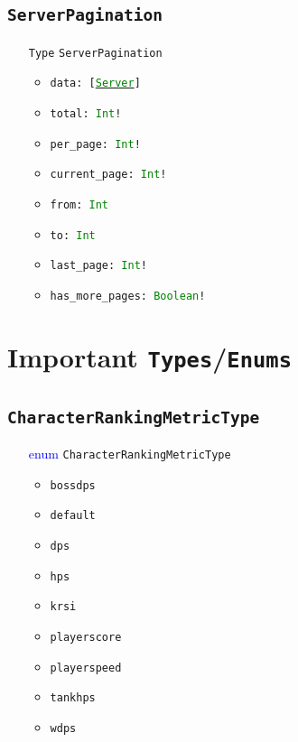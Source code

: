 \documentclass[10pt, a4paper]{memoir}
\numberwithin{equation}{section}
\theoremstyle{plain}
\theoremstyle{defp}
\theoremstyle{dotless}
\theoremstyle{definition}
\theoremstyle{dotless}
\theoremstyle{dotless}
\theoremstyle{defp}
\theoremstyle{defp}
\theoremstyle{be}          %
\theoremstyle{defp}
\newcommand\ttt[1]{\texttt{#1}}
\newcommand\type[1]{\ttt{\textcolor{green}{#1}}}
\begin{document}
\subsection{\ttt{ServerPagination}} \label{sec:serverpagination}

\begin{itemize}[noitemsep,topsep=1pt]
\item[\ttt{Type}] \ttt{ServerPagination}
\begin{itemize}[itemsep=1pt,topsep=1pt]
\item \ttt{data: [\hyperref[sec:Server]{\type{Server}}]}
\item \ttt{total: \type{Int}!}
\item \ttt{per\_page: \type{Int}!}
\item \ttt{current\_page: \type{Int}!}
\item \ttt{from: \type{Int}}
\item \ttt{to: \type{Int}}
\item \ttt{last\_page: \type{Int}!}
\item \ttt{has\_more\_pages: \type{Boolean}!}
\end{itemize}
\end{itemize}

\newpage


\section{Important \ttt{Types}/\ttt{Enums}}\label{sec:Enums}

\subsection{\ttt{CharacterRankingMetricType}}\label{sec:CharacterRankingMetricType}
\begin{itemize}[noitemsep,topsep=1pt]
\item[\textcolor{blue}{enum}] \ttt{CharacterRankingMetricType}
\begin{itemize}[itemsep=1pt,topsep=1pt]
\item \ttt{bossdps}
\item \ttt{default}
\item \ttt{dps}
\item \ttt{hps}
\item \ttt{krsi}
\item \ttt{playerscore}
\item \ttt{playerspeed}
\item \ttt{tankhps}
\item \ttt{wdps}
\end{itemize}
\end{itemize}
\end{document}
